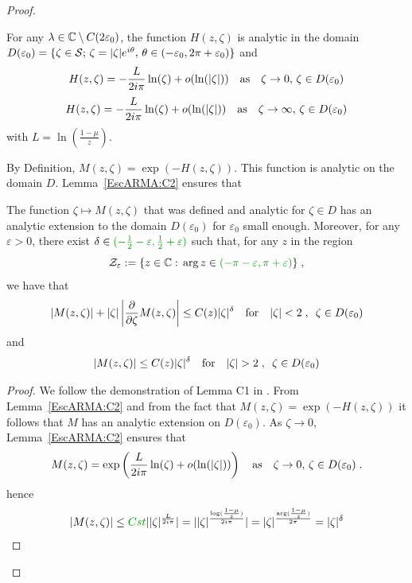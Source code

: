 \documentclass[11pt]{amsart}
\newcommand{\MD}{\color{vert}}
\newcommand{\ep}{\varepsilon}
\newcommand{\f}{\frac}
\begin{document}
\begin{proof}
\begin{lemma}\label{EscARMA:C2}For any $\lambda \in \mathbb{C} \setminus C(2\varepsilon_0)$, the function $H(z,\zeta)$ is analytic in the domain $D(\varepsilon_0) = \{ \zeta \in \mathcal{S}; \, \zeta = |\zeta|e^{i\theta}, \, \theta \in (-\varepsilon_0, 2\pi+\varepsilon_0)\}$ and 
$$ H(z, \zeta) = -\frac{L}{2i\pi } \ln(\zeta) + o(\ln(|\zeta|)) \quad \text{as} \quad \zeta\to 0,\, \zeta \in D(\varepsilon_0)$$ 
$$ H(z, \zeta) = -\frac{L}{2i\pi } \ln(\zeta) + o(\ln(|\zeta|)) \quad \text{as} \quad \zeta\to \infty,\, \zeta \in D(\varepsilon_0)$$ 
with $L = \ln(\frac{1-\mu}{z})$. 
\end{lemma}

By Definition, $ M(z, \zeta) = \exp(-H(z, \zeta))$. This function is analytic on the domain $D$. Lemma~\ref{EscARMA:C2} ensures that

\begin{lemma}\label{prop:cptM}The function $\zeta \mapsto M(z,\zeta)$ that was defined and analytic for $\zeta \in D$ has an analytic extension to the domain $D(\varepsilon_0)$ for $\varepsilon_0$ small enough. Moreover, for any $\varepsilon > 0$, there exist $\delta \in {\MD (-\f{1}{2}-\ep,\f{1}{2}+\ep)}$ such that, for any $z$ in the region
    $$ \Zcal_\varepsilon := \{ z \in \CC :\, \arg z \in {\MD (-\pi-\varepsilon, \pi +\varepsilon)}\} \eqfinv$$ we have that 
    \begin{equation}
        |M(z, \zeta)| + |\zeta|\left| \frac{\partial}{\partial \zeta}M(z,\zeta)\right|
        \leq 
        C(z) |\zeta|^\delta \quad \text{for} \quad |\zeta| < 2 \; , \enspace \zeta \in D(\varepsilon_0)
    \end{equation}
    and 
    \begin{equation}
        |M(z,\zeta)| \leq C(z)|\zeta|^{\delta} \quad \text{for} \quad |\zeta| > 2 \; , \enspace \zeta \in D(\varepsilon_0)
    \end{equation}
\end{lemma}
\begin{proof}We follow the demonstration of Lemma C1 in \cite{escobedo2007fundamental}. From Lemma~\ref{EscARMA:C2} and from the fact that $M(z, \zeta) = \exp(-H(z,\zeta))$ it follows that $M$ has an analytic extension on $D(\varepsilon_0)$.
As $\zeta \to 0$, Lemma~\ref{EscARMA:C2} ensures that 
$$ M(z, \zeta) = \exp\left(\frac{L}{2i\pi } \ln(\zeta) + o(\ln(|\zeta|)) \right)  \quad \text{as} \quad \zeta\to 0,\, \zeta \in D(\varepsilon_0) \; .$$
hence
$$ \vert {M(z,\zeta)}{} \vert \leq {\MD Cst} \vert {|\zeta|^{\frac{L}{2i\pi}}}\vert=
\vert |\zeta|^{\frac{\log(\frac{1-\mu}{z})}{2i\pi}}\vert = \vert \zeta \vert^{\frac{\arg (\frac{1-\mu}{z})}{2\pi}}=\vert \zeta \vert^\delta
$$
\end{proof}
\end{proof}
\end{document}
